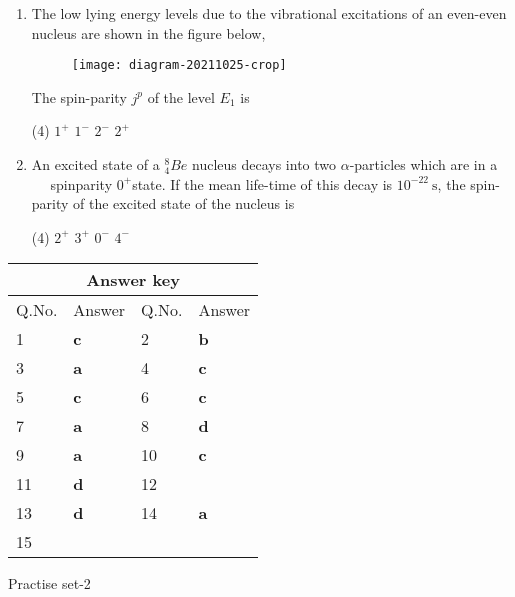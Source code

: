 \begin{enumerate}
\begin{tasks}
\end{tasks}
	\item  The low lying energy levels due to the vibrational excitations of an even-even nucleus are shown in the figure below,
		\begin{figure}[H]
		\centering
		\texttt{[image: diagram-20211025-crop]}
	\end{figure}
	The spin-parity $j^p$ of the level $E_1$ is
	{}
 \begin{tasks}(4)
	\task[\textbf{a.}]$1^{+}$
	\task[\textbf{b.}]$1^{-}$
	\task[\textbf{c.}]$2^{-}$
	\task[\textbf{d.}]$2^{+}$ 
\end{tasks}
	 \item  An excited state of a ${ }_4^8 B e$ nucleus decays into two $\alpha$-particles which are in a $\quad$ spinparity $0^{+}$state. If the mean life-time of this decay is $10^{-22} \mathrm{~s}$, the spin-parity of the excited state of the nucleus is
	 \begin{tasks}(4)
		\task[\textbf{a.}]$2^{+}$
		\task[\textbf{b.}]$3^{+}$
		\task[\textbf{c.}]$0^{-}$
		\task[\textbf{d.}]$4^{-}$ 
	\end{tasks}
\end{enumerate}
\setlength\arrayrulewidth{1pt}
\begin{table}[H]
	\centering
	\begin{tabular}{|p{1.5cm}|p{1.5cm}||p{1.5cm}|p{1.5cm}|}
		\hline
		\multicolumn{4}{|c|}{\textbf{Answer key}}\\\hline\hline
		\rowcolor{ocrel}Q.No.&Answer&Q.No.&Answer\\\hline
		1&\textbf{c} &2&\textbf{b}\\\hline 
		3&\textbf{a} &4&\textbf{c} \\\hline
		5&\textbf{c} &6&\textbf{c} \\\hline
		7&\textbf{a}&8&\textbf{d}\\\hline
		9&\textbf{a}&10&\textbf{c}\\\hline
		11&\textbf{d} &12&\textbf{}\\\hline
		13&\textbf{d}&14&\textbf{a}\\\hline
		15&\textbf{}& &\\\hline
		
	\end{tabular}
\end{table}
\newpage
\begin{abox}
	Practise set-2
	\end{abox}
